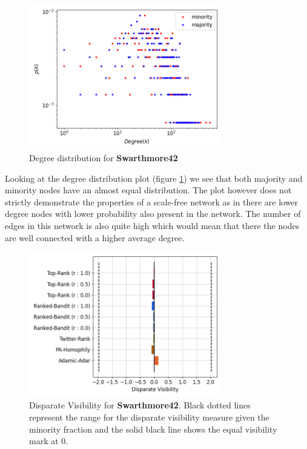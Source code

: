 \begin{figure}
	\centering
	\includegraphics[trim=0 10 0 10, clip, width=0.75\textwidth]{images/dd_swarthmore.png}
	\caption{Degree distribution for \textbf{Swarthmore42}}
	\label{dd_swarthmore}
\end{figure}

Looking at the degree distribution plot (figure \ref{dd_swarthmore}) we see that both majority and minority nodes have an almost equal distribution. The plot however does not strictly demonstrate the properties of a scale-free network as in there are lower degree nodes with lower probability also present in the network. The number of edges in this network is also quite high which would mean that there the nodes are well connected with a higher average degree.

\begin{figure}
	\centering
	\includegraphics[trim=0 10 0 10, clip, width=0.75\textwidth]{images/dv_swarthmore.png}
	\caption{Disparate Visibility for \textbf{Swarthmore42}. Black dotted lines represent the range for the disparate visibility measure given the minority fraction and the solid black line shows the equal visibility mark at 0.}
	\label{dv_swarthmore}
\end{figure}

